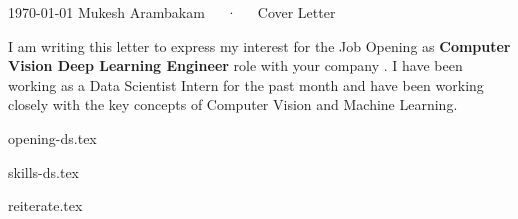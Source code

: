 \documentclass[11pt, a4paper]{awesome-cv}
\newcommand*{\sectiondir}{coverletter/}
\begin{document}
\makecvheader[R]

\makecvfooter
  {\today}
  {Mukesh Arambakam~~~·~~~Cover Letter}
  {}

\makelettertitle

\begin{cvletter}

I am writing this letter to express my interest for the
{Job Opening}
as
\textbf{Computer Vision Deep Learning Engineer}
role with your company%
\textbf{
}.
I have been working as a Data Scientist Intern for the past month and have been working closely with the key concepts of Computer Vision and Machine Learning.

{opening-ds.tex}

{skills-ds.tex}

{reiterate.tex}




\end{cvletter}


\makeletterclosing
\end{document}
